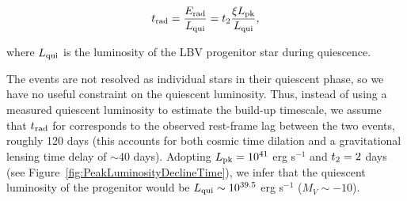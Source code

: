\begin{equation}
  \label{eqn:trad}
t_{\rm rad} = \frac{E_{\rm rad}}{L_{\rm qui}} = \t2 \frac{\xi\Lpk}{L_{\rm qui}},
\end{equation}

\noindent where $L_{\rm qui}$ is the luminosity of the LBV progenitor
star during quiescence.

The \spock events are not resolved as individual stars in their
quiescent phase, so we have no useful constraint on the quiescent
luminosity. Thus, instead of using a measured quiescent luminosity to
estimate the build-up timescale, we assume that $t_{\rm rad}$ for
\spock corresponds to the observed rest-frame lag between the two
events, roughly 120 days (this accounts for both cosmic time dilation
and a gravitational lensing time delay of $\sim$40 days). Adopting
$L_{\rm pk}=10^{41}$ erg s$^{-1}$ and $\t2=2$ days (see
Figure~\ref{fig:PeakLuminosityDeclineTime}), we infer that the
quiescent luminosity of the \spock progenitor would be $L_{\rm
  qui}\sim10^{39.5}$ erg s$^{-1}$ ($M_V\sim-10$).







